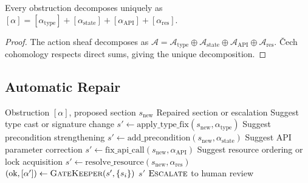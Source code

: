 \documentclass[11pt]{article}
\newcommand{\ActionSheaf}{\mathscr{A}}
\newcommand{\GateKeeper}{\textsc{GateKeeper}}
\begin{document}
\begin{theorem}\label{thm:conflict-decomp}
Every obstruction decomposes uniquely as
$[\alpha] = [\alpha_{\mathrm{type}}] + [\alpha_{\mathrm{state}}] +
[\alpha_{\mathrm{API}}] + [\alpha_{\mathrm{res}}]$.
\end{theorem}

\begin{proof}
The action sheaf decomposes as
$\ActionSheaf = \ActionSheaf_{\mathrm{type}} \oplus
\ActionSheaf_{\mathrm{state}} \oplus \ActionSheaf_{\mathrm{API}} \oplus
\ActionSheaf_{\mathrm{res}}$.  \v{C}ech cohomology respects direct sums,
giving the unique decomposition.
\end{proof}

\subsection{Automatic Repair}\label{subsec:repair}

\begin{algorithm}[H]
\caption{$\textsc{SuggestRepair}$: Obstruction-Guided Action Repair}
\label{alg:repair}
\begin{algorithmic}[1]
\REQUIRE Obstruction $[\alpha]$, proposed section $s_{\mathrm{new}}$
\ENSURE Repaired section or escalation
  \STATE Suggest type cast or signature change
  \STATE $s' \leftarrow \mathrm{apply\_type\_fix}(s_{\mathrm{new}}, \alpha_{\mathrm{type}})$
  \STATE Suggest precondition strengthening
  \STATE $s' \leftarrow \mathrm{add\_precondition}(s_{\mathrm{new}}, \alpha_{\mathrm{state}})$
  \STATE Suggest API parameter correction
  \STATE $s' \leftarrow \mathrm{fix\_api\_call}(s_{\mathrm{new}}, \alpha_{\mathrm{API}})$
  \STATE Suggest resource ordering or lock acquisition
  \STATE $s' \leftarrow \mathrm{resolve\_resource}(s_{\mathrm{new}}, \alpha_{\mathrm{res}})$
\ENDIF
\STATE $(\text{ok}, [\alpha']) \leftarrow \GateKeeper(s', \{s_i\})$
  \RETURN $s'$
\ELSE
  \RETURN $\textsc{Escalate}$ to human review
\ENDIF
\end{algorithmic}
\end{algorithm}
\end{document}
